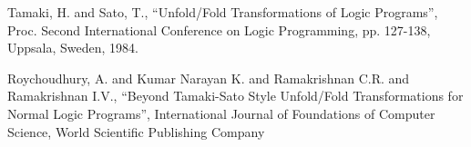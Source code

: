 \documentclass{article}
\begin{document}
  \begin{thebibliography}{1}


    Tamaki, H. and Sato, T.,
    ``Unfold/Fold Transformations of Logic Programs'',
    Proc. Second International Conference on Logic Programming,
    pp. 127-138,
    Uppsala, Sweden, 1984.


    Roychoudhury, A. and Kumar Narayan K. and Ramakrishnan C.R. and Ramakrishnan I.V.,
    ``Beyond Tamaki-Sato Style Unfold/Fold Transformations for Normal Logic Programs'',
    International Journal of Foundations of Computer Science,
    World Scientific Publishing Company


  \end{thebibliography}
\end{document}
